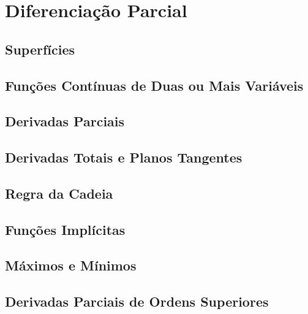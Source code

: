 \chapter{Diferenciação Parcial}
\label{chp:partialdiff}

\section{Superfícies}
\label{sec:surfaces}

\section{Funções Contínuas de Duas ou Mais Variáveis}
\label{sec:func2ormore}

\section{Derivadas Parciais}
\label{sec:partialdiff}

\section{Derivadas Totais e Planos Tangentes}
\label{sec:totaldiff}

\section{Regra da Cadeia}
\label{sec:chainrulepartial}

\section{Funções Implícitas}
\label{sec:implicitfunc}

\section{Máximos e Mínimos}
\label{sec:maximaminima}

\section{Derivadas Parciais de Ordens Superiores}
\label{sec:higherpartialdiff}

\begin{chapterproblems}
\end{chapterproblems}


